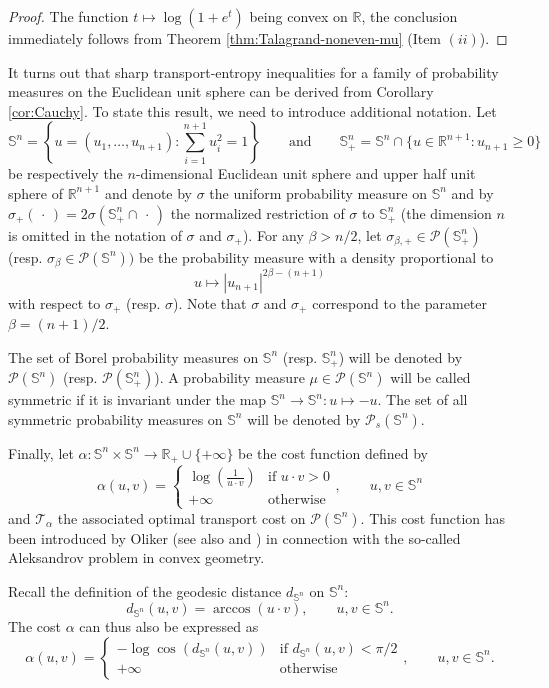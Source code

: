 \documentclass[10pt]{amsart}
\theoremstyle{definition}
\theoremstyle{remark}
\newcommand{\R}{\mathbb{R}}
\newcommand{\Sd}{\mathbb{S}}
\begin{document}
\begin{proof}
The function $t\mapsto \log (1+e^t)$ being convex on $\R$, the conclusion immediately follows from Theorem \ref{thm:Talagrand-noneven-mu} (Item $(ii)$).
\end{proof}

It turns out that sharp transport-entropy inequalities for a family of probability measures on the Euclidean unit sphere can be derived from Corollary \ref{cor:Cauchy}. To state this result, we need to introduce additional notation. Let 
\[
\Sd^n = \left\{u=(u_1,\ldots,u_{n+1}) : \sum_{i=1}^{n+1} u_i^2=1\right\}\qquad \text{and}\qquad \Sd^n_+=\Sd^n \cap \{u\in \R^{n+1} : u_{n+1}\geq0\}
\]
be respectively the $n$-dimensional Euclidean unit sphere and upper half unit sphere of $\R^{n+1}$ and denote by $\sigma$ the uniform probability measure on $\Sd^n$ and by $\sigma_+(\,\cdot\,) = 2 \sigma(\Sd^n_+ \cap \,\cdot\,)$ the normalized restriction of $\sigma$ to $\Sd^n_+$ (the dimension $n$ is omitted in the notation of $\sigma$ and $\sigma_+$). For any $\beta>n/2$, let $\sigma_{\beta,+} \in \mathcal{P}(\Sd^n_+)$ (resp. $\sigma_{\beta} \in \mathcal{P}(\Sd^n))$ be the probability measure with a density proportional to 
\[
u\mapsto|u_{n+1}|^{2\beta-(n+1)}
\]
with respect to $\sigma_+$ (resp. $\sigma$). Note that $\sigma$ and $\sigma_+$ correspond to the parameter $\beta = (n+1)/2$.

The set of Borel probability measures on $\Sd^n$ (resp. $\Sd^n_+$) will be denoted by $\mathcal{P}(\Sd^n)$ (resp. $\mathcal{P}(\Sd^n_+)$). A probability measure $\mu \in \mathcal{P}(\Sd^n)$ will be called symmetric if it is invariant under the map $\Sd^n\to \Sd^n :u \mapsto -u$. The set of all symmetric probability measures on $\Sd^n$ will be denoted by $\mathcal{P}_s(\Sd^n)$.

Finally, let  $\alpha : \Sd^n\times \Sd^n \to \R_+\cup\{+\infty\}$ be the cost function defined by 
\[
\alpha(u,v) = \left\{\begin{array}{ll}  \log \left(\frac{1}{u\cdot v}\right)  & \text{if } u\cdot v >0    \\ + \infty  & \text{otherwise}  \end{array}\right.,\qquad u,v \in \Sd^n
\]
and $\mathcal{T}_\alpha$ the associated optimal transport cost on $\mathcal{P}(\Sd^n)$. This cost function has been introduced by Oliker \cite{Olik07} (see also \cite{Ber16} and \cite{Kol20}) in connection with the so-called Aleksandrov problem in convex geometry. 

Recall the definition of the geodesic distance $d_{\Sd^n}$ on $\Sd^n$:
\[
d_{\Sd^n}(u,v) = \arccos (u\cdot v),\qquad u,v \in \Sd^n.
\]
The cost $\alpha$ can thus also be expressed as 
\begin{equation}\label{eq:alpha-geod}
\alpha(u,v) =\left\{\begin{array}{ll}  -\log \cos(d_{\Sd^n}(u,v))  & \text{if } d_{\Sd^n}(u,v)<\pi/2    \\ + \infty  & \text{otherwise}  \end{array}\right.,\qquad u,v \in \Sd^n.
\end{equation}
\end{document}
